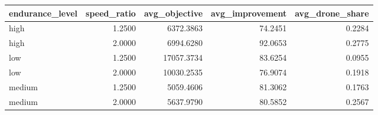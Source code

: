 \begin{tabular}{lrrrr}
\toprule
endurance_level & speed_ratio & avg_objective & avg_improvement & avg_drone_share \\
\midrule
high & 1.2500 & 6372.3863 & 74.2451 & 0.2284 \\
high & 2.0000 & 6994.6280 & 92.0653 & 0.2775 \\
low & 1.2500 & 17057.3734 & 83.6254 & 0.0955 \\
low & 2.0000 & 10030.2535 & 76.9074 & 0.1918 \\
medium & 1.2500 & 5059.4606 & 81.3062 & 0.1763 \\
medium & 2.0000 & 5637.9790 & 80.5852 & 0.2567 \\
\bottomrule
\end{tabular}
